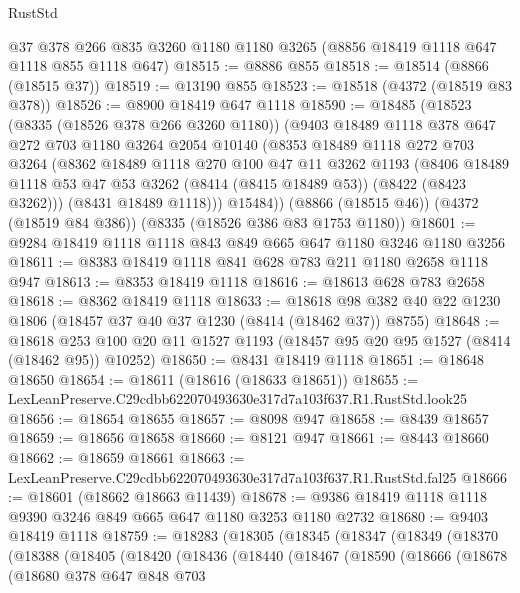 \begin{lexlean}{RustStd}
\begin{coremodule}
    @37
    @378
    @266
    @835
    @3260
    @1180
    @1180
    @3265
    (@8856 @18419 @1118 @647 @1118 @855 @1118 @647)
@18515 := @8886 @855
@18518 := @18514 (@8866 (@18515 @37))
@18519 := @13190 @855
@18523 := @18518 (@4372 (@18519 @83 @378))
@18526 := @8900 @18419 @647 @1118
@18590 := @18485
    (@18523
      (@8335 (@18526 @378 @266 @3260 @1180))
      (@9403
        @18489
        @1118
        @378
        @647
        @272
        @703
        @1180
        @3264
        @2054
        @10140
        (@8353
          @18489
          @1118
          @272
          @703
          @3264
          (@8362
            @18489
            @1118
            @270
            @100
            @47
            @11
            @3262
            @1193
            (@8406 @18489 @1118 @53 @47 @53 @3262 (@8414 (@8415 @18489 @53)) (@8422 (@8423 @3262)))
            (@8431 @18489 @1118)))
        @15484))
    (@8866 (@18515 @46))
    (@4372 (@18519 @84 @386))
    (@8335 (@18526 @386 @83 @1753 @1180))
@18601 := @9284 @18419 @1118 @1118 @843 @849 @665 @647 @1180 @3246 @1180 @3256
@18611 := @8383 @18419 @1118 @841 @628 @783 @211 @1180 @2658 @1118 @947
@18613 := @8353 @18419 @1118
@18616 := @18613 @628 @783 @2658
@18618 := @8362 @18419 @1118
@18633 := @18618 @98 @382 @40 @22 @1230 @1806 (@18457 @37 @40 @37 @1230 (@8414 (@18462 @37)) @8755)
@18648 := @18618
    @253
    @100
    @20
    @11
    @1527
    @1193
    (@18457 @95 @20 @95 @1527 (@8414 (@18462 @95)) @10252)
@18650 := @8431 @18419 @1118
@18651 := @18648 @18650
@18654 := @18611 (@18616 (@18633 @18651))
@18655 := LexLeanPreserve.C29cdbb622070493630e317d7a103f637.R1.RustStd.look25
@18656 := @18654 @18655
@18657 := @8098 @947
@18658 := @8439 @18657
@18659 := @18656 @18658
@18660 := @8121 @947
@18661 := @8443 @18660
@18662 := @18659 @18661
@18663 := LexLeanPreserve.C29cdbb622070493630e317d7a103f637.R1.RustStd.fal25
@18666 := @18601 (@18662 @18663 @11439)
@18678 := @9386 @18419 @1118 @1118 @9390 @3246 @849 @665 @647 @1180 @3253 @1180 @2732
@18680 := @9403 @18419 @1118
@18759 := @18283
    (@18305
      (@18345
        (@18347
          (@18349
            (@18370
              (@18388
                (@18405
                  (@18420
                    (@18436
                      (@18440
                        (@18467
                          (@18590
                            (@18666
                              (@18678
                                (@18680
                                  @378
                                  @647
                                  @848
                                  @703

\end{coremodule}
\end{lexlean}
